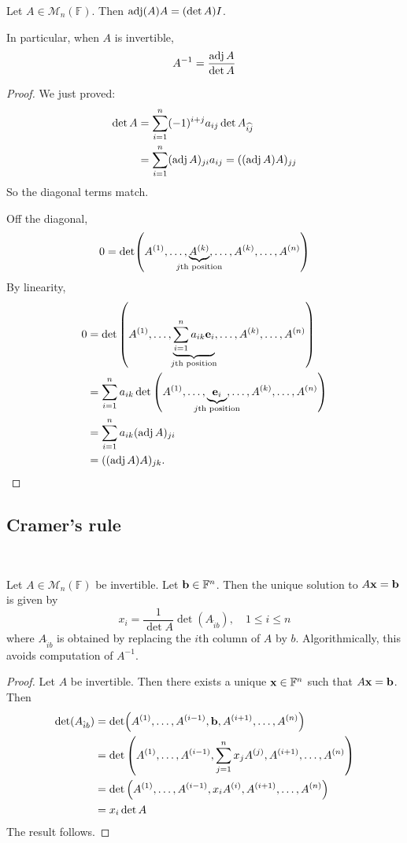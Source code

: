 \documentclass[a4paper,11pt]{article}
\begin{document}
\begin{theorem}
	Let $ A \in \mathcal{M}_n (\mathbb{F}) $. Then $ \operatorname{adj}(A) A = (\det A) I $. 
	
	In particular, when $ A $ is invertible,
	\[
		A^{-1} = \frac{\operatorname{adj} A}{\det A}
	\]
\end{theorem}
\begin{proof}
	We just proved:
	\begin{align*}
		\det A &= \sum_{i=1}^n (-1)^{i+j} a_{ij} \det A_{\widehat{ij}} \\
		&= \sum_{i=1}^n (\operatorname{adj} A)_{ji} a_{ij} = ((\operatorname{adj} A) A)_{jj}
	\end{align*}
	So the diagonal terms match.
	
	Off the diagonal,
	\[
		0 = \det(A^{(1)}, \dots, \underbrace{A^{(k)}}_{\mathclap{j\text{th position}}}, \dots, A^{(k)}, \dots, A^{(n)})
	\]
	By linearity,
	\begin{align*}
		0 & = \det\qty(A^{(1)}, \dots, \underbrace{\sum_{i=1}^n a_{ik} \bfe_i}_{\mathclap{j\text{th position}}}, \dots, A^{(k)}, \dots, A^{(n)}) \\
		  & = \sum_{i=1}^n a_{ik} \det\qty(A^{(1)}, \dots, \underbrace{\bfe_i}_{\mathclap{j\text{th position}}}, \dots, A^{(k)}, \dots, A^{(n)}) \\
		  & = \sum_{i=1}^n a_{ik} (\adj A)_{ji}                                                                                               \\
		  & = ((\adj A) A)_{jk}. \qedhere
	\end{align*}
\end{proof}

\subsection{Cramer's rule}\ \vspace{-1.5em}
\begin{proposition}
	Let $ A\in \mathcal{M}_n(\mathbb{F}) $ be invertible. 
	Let $ {\bf b} \in {\mathbb{F}}^n $.
	Then the unique solution to $ A{\bf x} = {\bf b} $ is given by
	\[
		x_i = \frac{1}{\det A} \det (A_{\hat{i}b}),\quad 1\le i\le n
	\]
	where $ A_{\hat{i}b} $ is obtained by replacing the $ i$th column of $ A $ by $ b $.
	Algorithmically, this avoids computation of $A^{-1}$. 
\end{proposition}

\begin{proof}
	Let $ A $ be invertible.
	Then there exists a unique $ {\bf x} \in {\mathbb{F}}^n $ such that $A {\bf x} = {\bf b} $.
	Then
	\begin{align*}
		\det (A_{\hat{i}b}) & = \det(A^{(1)}, \dots, A^{(i-1)}, {\bf b}, A^{(i+1)}, \dots, A^{(n)})                            \\
		                        & = \det\qty(A^{(1)}, \dots, A^{(i-1)}, \sum_{j=1}^n x_j A^{(j)}, A^{(i+1)}, \dots, A^{(n)}) \\
		                        & = \det\qty(A^{(1)}, \dots, A^{(i-1)}, x_i A^{(i)}, A^{(i+1)}, \dots, A^{(n)})              \\
		                        & = x_i \det A
	\end{align*}
	The result follows.
\end{proof}
\end{document}
